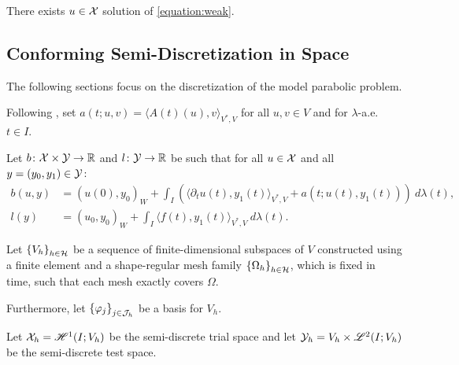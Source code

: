 \begin{lemma}[Existence]
    There exists $u \in \mathcal{X}$ solution of \cref{equation:weak}.
\end{lemma}


\newpage
\subsection{Conforming Semi-Discretization in Space} \label{subsection:space_discretization}

The following sections focus on the discretization of the model parabolic problem.

Following \cite[p.~135]{Ern2021}, set $a(t; u, v) = \langle A(t)(u), v \rangle_{V^*, V}$ for all $u, v \in V$ and for $\lambda$-a.e. $t \in I$.

\begin{definition}[$b$ and $l$]
    Let $b \colon \mathcal{X} \times \mathcal{Y} \rightarrow \mathbb{R}$ and $l \colon \mathcal{Y} \rightarrow \mathbb{R}$ be such that for all $u \in \mathcal{X}$ and all $y = (y_0, y_1) \in \mathcal{Y}$:
    \begin{align}
        b(u, y) &= \left( u(0), y_0 \right)_W + \int_I \left( \langle \partial_t u(t), y_1(t) \rangle_{V^*, V} + a(t; u(t), y_1(t)) \right)~ d \lambda(t), \\
        l(y) &= \left( u_0, y_0 \right)_W + \int_I \langle f(t), y_1(t) \rangle_{V^*, V} ~ d \lambda(t).
    \end{align}
\end{definition}

Let $\left\{ V_h \right\}_{h \in \mathcal{H}}$ be a sequence of finite-dimensional subspaces of $V$ constructed using a finite element and a shape-regular mesh family $\left\{ \Omega_{h} \right\}_{h \in \mathcal{H}}$, which is fixed in time, such that each mesh exactly covers $\Omega$.

Furthermore, let $\left\{ \varphi_j \right\}_{j \in \mathcal{J}_h}$ be a basis for $V_h$.

\begin{definition}
    Let $\mathcal{X}_h = \mathscr{H}^{1}(I; V_h)$ be the semi-discrete trial space and let $\mathcal{Y}_h = V_h \times \mathscr{L}^{2}(I; V_h)$ be the semi-discrete test space.
\end{definition}


